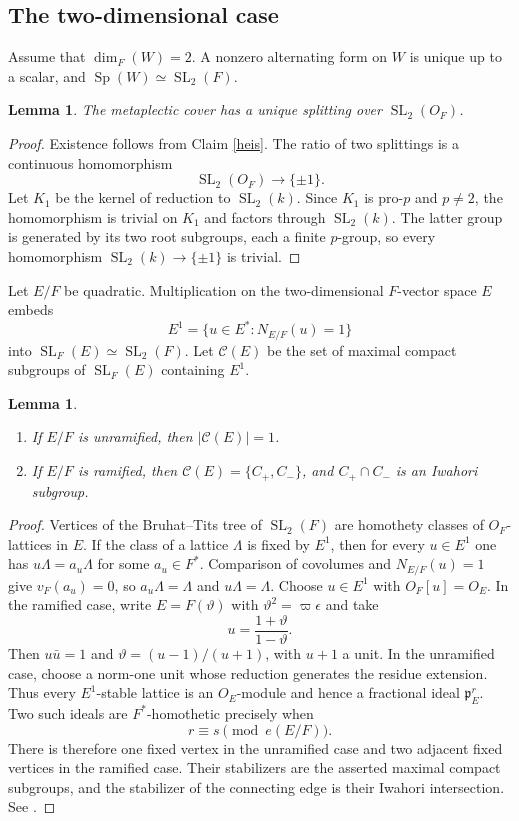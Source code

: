 \documentclass[11pt,a4paper,twoside]{amsart}
\newtheorem{lemma}[theorem]{Lemma}
\theoremstyle{definition}
\theoremstyle{remark}
\newcommand{\mcC}{\mathcal C}
\newcommand{\Sp}{\operatorname{Sp}}
\newcommand{\SL}{\operatorname{SL}}
\begin{document}
\subsection{The two-dimensional case}
Assume that $\dim_F(W)=2$. A nonzero alternating form on $W$ is unique up to a scalar, and $\Sp(W)\simeq\SL_2(F)$.
\begin{lemma}\label{unique-splitting}
The metaplectic cover has a unique splitting over $\SL_2(O_F)$.
\end{lemma}
\begin{proof}
Existence follows from Claim \ref{heis}. The ratio of two splittings is a continuous homomorphism
$$
\SL_2(O_F)\longrightarrow\{\pm1\}.
$$
Let $K_1$ be the kernel of reduction to $\SL_2(k)$. Since $K_1$ is pro-$p$ and $p\neq2$, the homomorphism is trivial on $K_1$ and factors through $\SL_2(k)$. The latter group is generated by its two root subgroups, each a finite $p$-group, so every homomorphism $\SL_2(k)\to\{\pm1\}$ is trivial.
\end{proof}
Let $E/F$ be quadratic. Multiplication on the two-dimensional $F$-vector space $E$ embeds
$$
E^1=\{u\in E^*:N_{E/F}(u)=1\}
$$
into $\SL_F(E)\simeq\SL_2(F)$. Let $\mcC(E)$ be the set of maximal compact subgroups of $\SL_F(E)$ containing $E^1$.
\begin{lemma}\label{lif}
\begin{enumerate}
\item If $E/F$ is unramified, then $|\mcC(E)|=1$.
\item If $E/F$ is ramified, then $\mcC(E)=\{C_+,C_-\}$, and $C_+\cap C_-$ is an Iwahori subgroup.
\end{enumerate}
\end{lemma}
\begin{proof}
Vertices of the Bruhat--Tits tree of $\SL_2(F)$ are homothety classes of $O_F$-lattices in $E$. If the class of a lattice $\Lambda$ is fixed by $E^1$, then for every $u\in E^1$ one has $u\Lambda=a_u\Lambda$ for some $a_u\in F^*$. Comparison of covolumes and $N_{E/F}(u)=1$ give $v_F(a_u)=0$, so $a_u\Lambda=\Lambda$ and $u\Lambda=\Lambda$.
Choose $u\in E^1$ with $O_F[u]=O_E$. In the ramified case, write $E=F(\vartheta)$ with $\vartheta^2=\varpi\epsilon$ and take
$$
u=\frac{1+\vartheta}{1-\vartheta}.
$$
Then $u\bar u=1$ and $\vartheta=(u-1)/(u+1)$, with $u+1$ a unit. In the unramified case, choose a norm-one unit whose reduction generates the residue extension. Thus every $E^1$-stable lattice is an $O_E$-module and hence a fractional ideal $\mathfrak p_E^r$. Two such ideals are $F^*$-homothetic precisely when
$$
r\equiv s\pmod{e(E/F)}.
$$
There is therefore one fixed vertex in the unramified case and two adjacent fixed vertices in the ramified case. Their stabilizers are the asserted maximal compact subgroups, and the stabilizer of the connecting edge is their Iwahori intersection. See \cite{S}.
\end{proof}
\end{document}
